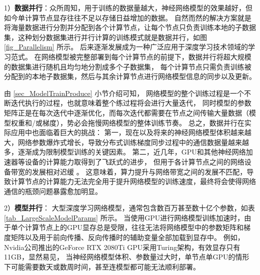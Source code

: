 \documentclass{xdupgthesis}
\begin{document}
1）\textbf{数据并行}：众所周知，用于训练的数据量越大，神经网络模型的效果越好，但如今单计算节点显存往往不足以存储日益增加的数据。
自然而然的解决方案就是将海量数据进行分割并分配到各个计算节点，让每个节点只负责训练本地的子数据集，这种划分数据集进行并行计算的训练模式就是数据并行，如图 \ref{fig_Parallelism}  所示。
后来逐渐发展成为一种广泛应用于深度学习技术领域的学习范式。
在网络模型被完整部署到每个计算节点的前提下，数据并行将超大规模的数据集进行随机且均匀地分割成多个子数据集，
每个计算节点只需负责训练被分配到的本地子数据集，然后与其余计算节点进行网络模型信息的同步以及更新。

由 \ref{sec_ModelTrainProduce} 小节介绍可知，
网络模型的整个训练过程是一个不断迭代执行的过程，也就意味着整个练过程将会进行大量迭代，
同时模型的参数矩阵正是在每次迭代中逐渐优化，而每次迭代都需要在节点之间传输大量数据（模型权重和/或梯度），势必会拖慢网络模型的整体训练节奏。
总之，数据并行在实际应用中也面临着巨大的挑战：
第一，现在以及将来的神经网络模型体积越来越大，网络参数爆炸式增长，导致分布式训练梯度同步过程中的通信数据量越来越多，逐渐成为限制模型训练的关键因素。
第二，近几年，GPU和其他神经网络加速器等设备的计算能力取得到了飞跃式的进步，
但用于各计算节点之间的网络设备带宽的发展相对迟缓 \cite{gholami2021ai}。
这意味着，算力提升与网络带宽之间的发展不匹配，导致计算节点的计算能力无法完全用于提升网络模型的训练速度，最终将会使得网络通信的瓶颈问题暴露愈加明显。

2）\textbf{模型并行}：
大型深度学习网络模型，通常包含数百万甚至数十亿个参数，如表 \ref{tab_LargeScaleModelParams} 所示。
当使用GPU进行网络模型训练加速时，由于单个计算节点上的GPU显存总是受限，往往无法将网络模型中的参数矩阵和梯度矩阵以及用于前向传播、反向传播时的辅助变量全部加载到显存中。
例如，Nvidia公司推出的GeForce RTX 2080Ti GPU采用Turing架构，有效显存只有11GB，显然易见，
当神经网络模型体积、参数量过大时，单节点单GPU的情形下可能需要数天或数周时间，甚至连模型都可能无法顺利部署。

\renewcommand{\arraystretch}{1.3}
\begin{table}[ht]
    \centering
    \caption{常见大规模深度学习网络模型参数}
    \label{tab_LargeScaleModelParams}
\end{table}
\end{document}
